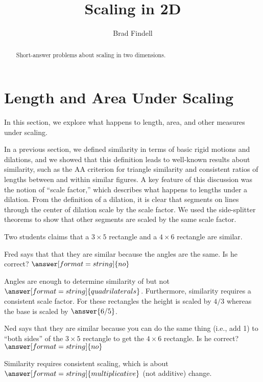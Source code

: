 \documentclass[nooutcomes]{ximera}
\title{Scaling in 2D}
\author{Brad Findell}
\begin{document}
\begin{abstract}
Short-answer problems about scaling in two dimensions. 
\end{abstract}
\maketitle




\section{Length and Area Under Scaling}
In this section, we explore what happens to length, area, and other measures under scaling.  
 
In a previous section, we defined similarity in terms of basic rigid motions and dilations, and we showed that this definition leads to well-known results about similarity, such as the AA criterion for triangle similarity and consistent ratios of lengths between and within similar figures. A key feature of this discussion was the notion of ``scale factor,'' which describes what happens to lengths under a dilation.  From the definition of a dilation, it is clear that segments on lines through the center of dilation scale by the scale factor.  We used the side-splitter theorems to show that other segments are scaled by the same scale factor.  

\begin{question}
Two students claims that a $3\times 5$ rectangle and a $4\times 6$ rectangle are similar.  

Fred says that that they are similar because the angles are the same.  Is he correct? 
$\answer[format=string]{no}$

\begin{question}
Angles are enough to determine similarity of 
but not $\answer[format=string]{quadrilaterals}$.  
Furthermore, similarity requires a consistent scale factor.  For these rectangles the height is scaled by $4/3$ whereas the base is scaled by $\answer{6/5}$.  

\begin{question}
Ned says that they are similar because you can do the same thing (i.e., add 1) to ``both sides'' of the $3\times 5$ rectangle to get the $4\times 6$ rectangle.  Is he correct? 
$\answer[format=string]{no}$

\begin{question}
Similarity requires consistent scaling, which is about $\answer[format=string]{multiplicative}$ (not additive) change.  
\end{question}
\end{question}
\end{question}
\end{question}
\end{document}
